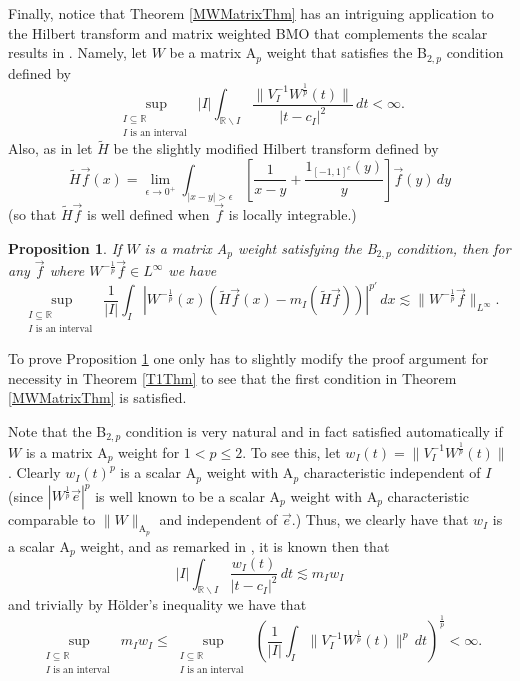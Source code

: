 \documentclass[12pt,reqno ]{amsart}
\numberwithin{equation}{section}
\newtheorem{proposition}[theorem]{Proposition}
\theoremstyle{definition}
\newcommand{\V}[1]{\ensuremath{\vec{#1}}}
\newcommand{\W}[1]{\ensuremath{\widetilde{#1}}}
\begin{document}
Finally, notice that Theorem \ref{MWMatrixThm} has an intriguing application to the Hilbert transform and matrix weighted BMO that complements the scalar results in \cite{MW}.  Namely, let $W$ be a matrix A${}_p$ weight that satisfies the B${}_{2, p}$ condition  defined by  \begin{equation*} \sup_{\substack{I \subseteq \mathbb{R} \\ I \text{ is an interval }}} |I| \int_{\mathbb{R} \backslash I} \frac{\|V_I ^{-1} W^\frac{1}{p} (t)\|}{|t - c_I|^2} \, dt < \infty. \end{equation*} Also, as in \cite{MW} let $\W{H}$ be the slightly modified Hilbert transform defined by \begin{equation*} \W{H} \V{f} (x) = \lim_{\epsilon \rightarrow 0^+} \int_{|x - y| > \epsilon} \left[\frac{1}{x-y} + \frac{1_{[-1, 1]^c} (y)}{y} \right] \V{f} (y) \, dy \end{equation*} (so that $\W{H} \V{f}$ is well defined when $\vec{f}$ is locally integrable.)


\begin{proposition} \label{MWHilbertProp} If $W$ is a matrix A${}_p$ weight satisfying the B${}_{2, p}$ condition, then for any $\vec{f}$ where $W^{-\frac{1}{p}} \vec{f} \in L^\infty$ we have \begin{equation*}  \sup_{\substack{I \subseteq \mathbb{R} \\ I \text{ is an interval }}} \frac{1}{|I|} \int_I |W^{-\frac{1}{p}}(x)   (\W{H} \V{f} (x) - m_I (\W{H} \V{f}))|^{p'} \, dx \lesssim \|W^{-\frac{1}{p}} \vec{f}\|_{L^\infty}.   \end{equation*} \end{proposition}

\noindent To prove Proposition \ref{MWHilbertProp} one only has to slightly modify the proof argument for necessity in Theorem \ref{T1Thm} to see that the first condition in Theorem \ref{MWMatrixThm} is satisfied.

 Note that the B${}_{2, p}$ condition is very natural and in fact satisfied automatically if $W$ is a matrix A${}_p$ weight for $1 < p \leq 2$.  To see this, let $w_I(t) = \|V_I ^{-1} W^\frac{1}{p} (t) \|$.  Clearly $w_I(t) ^p$ is a scalar A${}_p$ weight with A${}_p$ characteristic independent of $I$ (since  $|W^\frac{1}{p} \V{e} |^p$ is well known to be a scalar A${}_p$ weight with A${}_p$ characteristic comparable to $\|W\|_{\text{A}_p}$ and independent of $\V{e}$.)  Thus, we clearly have that $w_I$ is a scalar A${}_p$ weight, and as remarked in \cite{MW}, it is known then that \begin{equation*} |I| \int_{\mathbb{R} \backslash I} \frac{w_I(t)}{|t - c_I|^2} \, dt \lesssim m_I w_I \end{equation*}  and trivially by H\"{o}lder's inequality we have that \begin{equation*} \sup_{\substack{I \subseteq \mathbb{R} \\ I \text{ is an interval }}} m_I w_I \leq \sup_{\substack{I \subseteq \mathbb{R} \\ I \text{ is an interval }}} \left(\frac{1}{|I|} \int_I \|V_I ^{-1} W^\frac{1}{p} (t)\| ^p \, dt \right)^\frac{1}{p} < \infty. \end{equation*}
\end{document}
